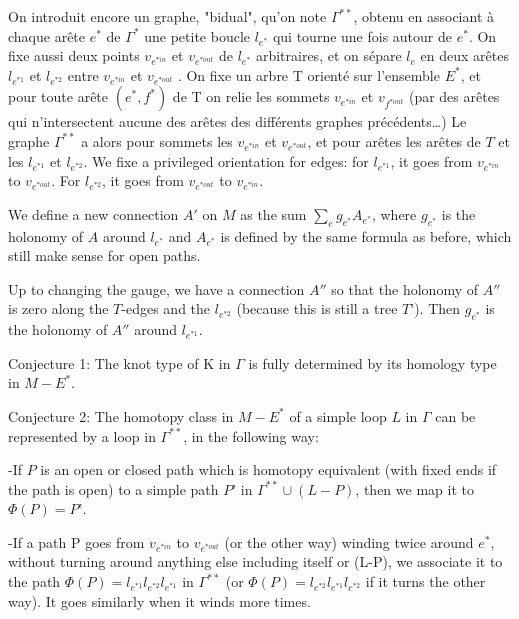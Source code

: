 \documentclass[10pt]{article}
\begin{document}
On introduit encore un graphe, "bidual", qu’on note $\Gamma^{**}$, obtenu en associant à chaque arête $e^*$ de $\Gamma^*$ une petite boucle $l_{e^*}$ qui tourne une fois autour de $e^*$. On fixe aussi deux points $v_{e^{*in}}$ et $v_{e^{*out}}$ de $l_{e^*}$ arbitraires, et on sépare $l_e$ en deux arêtes $l_{e^{*1}}$ et $l_{e^{*2}}$ entre $v_{e^{*in}}$ et $v_{e^{*out}}$ . On fixe un arbre T orienté sur l’ensemble $E^*$, et pour toute arête $(e^*,f^*)$ de T on  relie les sommets $v_{e^{*in}} $ et $v_{f^{*out}}$ (par des arêtes qui n’intersectent aucune des arêtes des différents graphes précédents…)
 Le graphe $\Gamma^{**}$ a alors pour sommets les $v_{e^{*in}}$ et $v_{e^{*out}}$, et pour arêtes les arêtes de $T$ et les $l_{e^{*1}}$ et $l_{e^{*2}}$. We fixe a privileged orientation for edges: for $l_{e^{*1}}$, it goes from $v_{e^{*in}}$ to $v_{e^{*out}}$. For $l_{e^{*2}}$, it goes from $v_{e^{*out}}$ to $v_{e^{*in}}$.


We define a new connection $A'$ on $M$ as the sum $\sum_e g_{e^*} A_{e^*}$, where $g_{e^*}$ is the holonomy of $A$ around $l_{e^*}$ and $A_{e^*}$ is defined by the same formula as before, which still make sense for open paths.

Up to changing the gauge, we have a connection $A''$ so that the holonomy of $A''$ is zero along the $T$-edges and the  $l_{e^{*2}}$ (because this is still a tree $T’$). Then $g_{e^*}$ is the holonomy of $A''$ around $l_{e^{*1}}$.

Conjecture 1: The knot type of K in $\Gamma$ is fully determined by its homology type in $M-E^*$.

Conjecture 2: The homotopy class in $M-E^*$  of a simple loop $L$ in $\Gamma$  can be represented by a loop in $\Gamma^{**}$, in the following way:

-If $P$ is an open or closed path which is homotopy equivalent (with fixed ends if the path is open) to a simple path $P’$ in $\Gamma^{**}\cup (L-P)$, then we map it to $\Phi(P)=P’$.

-If a path P goes from $v_{e^{*in}}$ to $v_{e^{*out}}$ (or the other way) winding twice around $e^*$, without turning around anything else including itself or (L-P), we associate it to the path $\Phi(P)= l_{e^{*1}}l_{e^{*2}}l_{e^{*1}} $ in $\Gamma^{**}$ (or $\Phi(P)=l_{e^{*2}}l_{e^{*1}}l_{e^{*2}}$ if it turns the other way). It goes similarly when it winds more times.
\end{document}
